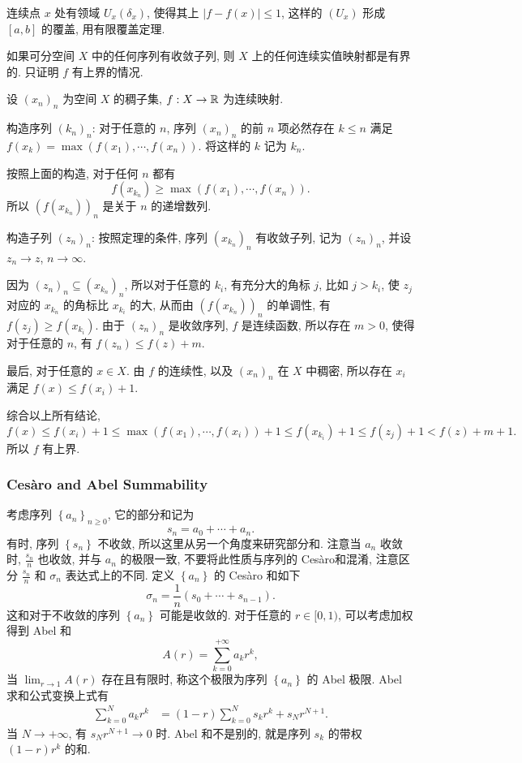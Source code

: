 连续点 $x$ 处有领域 $U_{x}(\delta_{x})$, 使得其上 $\left|f-f(x)\right|\le1$, 这样的 $\left(U_{x}\right)$ 形成 $[a,b]$ 的覆盖,
用有限覆盖定理.

\bt{}{}
如果可分空间 $X$ 中的任何序列有收敛子列, 则 $X$ 上的任何连续实值映射都是有界的.
\et
\ba
只证明 $f$ 有上界的情况.

设 $\left(x_{n}\right)_{n}$ 为空间 $X$ 的稠子集, $f:X\to\mathbb{R}$ 为连续映射.

构造序列 $\left(k_{n}\right)_{n}$: 对于任意的 $n$, 序列 $\left(x_{n}\right)_{n}$ 的前 $n$ 项必然存在 $k\le n$ 满足 $f(x_{k})=\max\left(f(x_{1}),\cdots,f(x_{n})\right)$.
将这样的 $k$ 记为 $k_{n}$.

按照上面的构造, 对于任何 $n$ 都有
\[
f\left(x_{k_{n}}\right)\ge\max\left(f(x_{1}),\cdots,f(x_{n})\right).
\]
所以 $\left(f\left(x_{k_{n}}\right)\right)_{n}$ 是关于 $n$ 的递增数列.

构造子列 $\left(z_{n}\right)_{n}$: 按照定理的条件, 序列 $\left(x_{k_{n}}\right)_{n}$ 有收敛子列,
记为 $\left(z_{n}\right)_{n}$, 并设 $z_{n}\to z$, $n\to\infty$. 

因为 $\left(z_{n}\right)_{n}\subseteq\left(x_{k_{n}}\right)_{n}$, 所以对于任意的 $k_{i}$,
有充分大的角标 $j$, 比如 $j>k_{i}$, 使 $z_{j}$ 对应的 $x_{k_{n}}$ 的角标比 $x_{k_{i}}$ 的大,
从而由 $\left(f\left(x_{k_{n}}\right)\right)_{n}$ 的单调性, 有 $f(z_{j})\ge f\left(x_{k_{i}}\right)$.
由于 $\left(z_{n}\right)_{n}$ 是收敛序列, $f$ 是连续函数, 所以存在 $m>0$, 使得对于任意的 $n$,
有 $f(z_{n})\le f(z)+m$.

最后, 对于任意的 $x\in X$. 由 $f$ 的连续性, 以及 $\left(x_{n}\right)_{n}$ 在 $X$ 中稠密,
所以存在 $x_{i}$ 满足 $f(x)\le f(x_{i})+1$.

综合以上所有结论, 
\[
f(x)\le f(x_{i})+1\le\max\left(f(x_{1}),\cdots,f(x_{i})\right)+1\le f\left(x_{k_{i}}\right)+1\le f(z_{j})+1<f(z)+m+1.
\]
所以 $f$ 有上界.
\ea

\subsubsection{Ces\`{a}ro and Abel Summability}

考虑序列 $\left\{ a_{n}\right\} _{n\ge0}$, 它的部分和记为
\[
s_{n}=a_{0}+\cdots+a_{n}.
\]
有时, 序列 $\left\{ s_{n}\right\}$ 不收敛, 所以这里从另一个角度来研究部分和. 注意当 $a_{n}$ 收敛时,
$\frac{s_{n}}{n}$ 也收敛, 并与 $a_{n}$ 的极限一致, 不要将此性质与序列的 Ces\`{a}ro和混淆,
注意区分 $\frac{s_{n}}{n}$ 和 $\sigma_{n}$ 表达式上的不同. 定义 $\left\{ a_{n}\right\}$ 的 Ces\`{a}ro 和如下
\[
\sigma_{n}=\frac{1}{n}(s_{0}+\cdots+s_{n-1}).
\]
这和对于不收敛的序列 $\left\{ a_{n}\right\}$ 可能是收敛的. 对于任意的 $r\in[0,1)$, 可以考虑加权得到 Abel 和
\[
A(r)=\sum_{k=0}^{+\infty}a_{k}r^{k},
\]
当 $\lim_{r\to1}A(r)$ 存在且有限时, 称这个极限为序列 $\left\{ a_{n}\right\}$ 的 Abel 极限.
Abel 求和公式变换上式有
\begin{align*}
	\sum_{k=0}^{N}a_{k}r^{k} & =(1-r)\sum_{k=0}^{N}s_{k}r^{k}+s_{N}r^{N+1}.
\end{align*}
当 $N\to+\infty$, 有 $s_{N}r^{N+1}\to0$ 时. Abel 和不是别的, 就是序列 $s_{k}$ 的带权 $(1-r)r^{k}$ 的和.

